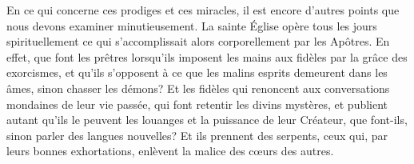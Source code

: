 En ce qui concerne ces prodiges et ces miracles,
	il est encore d’autres points que nous devons examiner minutieusement.
La sainte Église opère tous les jours spirituellement
	ce qui s’accomplissait alors corporellement par les Apôtres.
En effet, que font les prêtres
	lorsqu’ils imposent les mains aux fidèles par la grâce des exorcismes,
	et qu’ils s’opposent à ce que les malins esprits demeurent dans les âmes,
	sinon chasser les démons?
Et les fidèles qui renoncent aux conversations mondaines de leur vie passée,
	qui font retentir les divins mystères,
	et publient autant qu’ils le peuvent
		les louanges et la puissance de leur Créateur,
	que font-ils, sinon parler des langues nouvelles?
Et ils prennent des serpents, ceux qui, par leurs bonnes exhortations,
	enlèvent la malice des cœurs des autres.
